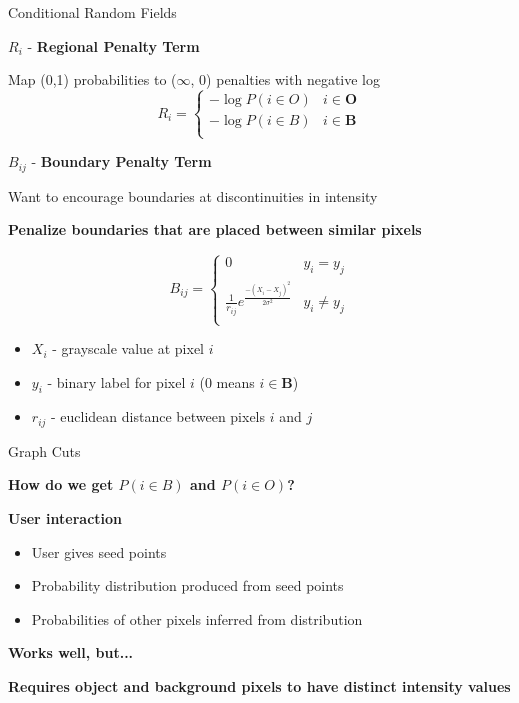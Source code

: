 \documentclass[10pt]{beamer}
\begin{document}
\begin{frame}[fragile]{Conditional Random Fields}

  
  $R_{i}$ - \textbf{Regional Penalty Term}

  Map (0,1) probabilities to ($\infty$, 0) penalties with negative log
  \begin{equation} R_{i} = \begin{cases} 
      -\log P(i \in O) & i \in \mathbf{O} \\
      -\log P(i \in B) & i \in \mathbf{B} \\
   \end{cases}
  \end{equation}

  \pause
  
  $B_{ij}$ - \textbf{Boundary Penalty Term}

  Want to encourage boundaries at discontinuities in intensity
  
  \textbf{Penalize boundaries that are placed between similar pixels}

  \begin{equation} B_{ij} = \begin{cases}
      0 & y_{i} = y_{j} \\
      \frac{1}{r_{ij}} e^{\frac{-(X_{i}-X_{j})^2}{2\sigma^2}} & y_{i} \neq y_{j} \\
    \end{cases}
    \label{eq:boundTerm}
  \end{equation}

  \begin{itemize}
  \item $X_{i}$ - grayscale value at pixel $i$
  \item $y_{i}$ - binary label for pixel $i$ (0 means $i \in \mathbf{B}$)
  \item $r_{ij}$ - euclidean distance between pixels $i$ and $j$
  \end{itemize}
    
\end{frame}


\begin{frame}[fragile]{Graph Cuts}

  \textbf{How do we get $P(i \in B)$ and $P(i \in O)$?}
  
  \textbf{User interaction}
  
  \begin{itemize}
  \item User gives seed points
  \item Probability distribution produced from seed points
  \item Probabilities of other pixels inferred from distribution
  \end{itemize}
  
  \textbf{Works well, but...}

  \pause
  \textbf{Requires object and background pixels to have distinct intensity values}
  
\end{frame}
\end{document}

